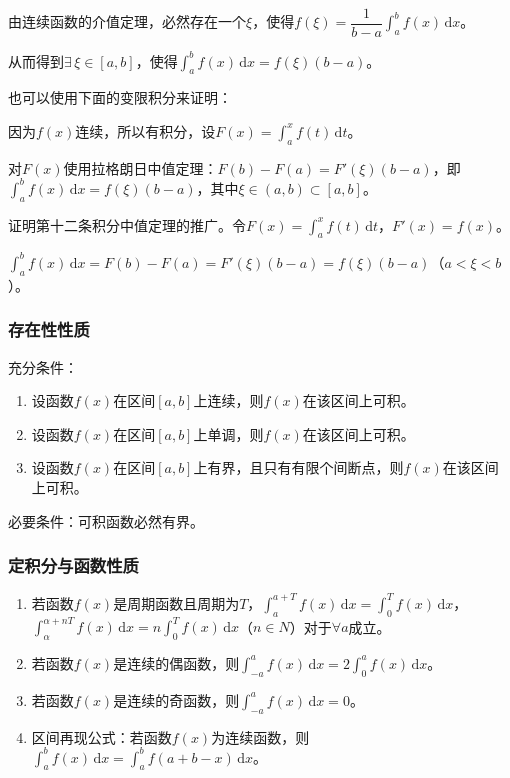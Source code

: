 \documentclass[UTF8, 12pt]{ctexart}
\begin{document}
由连续函数的介值定理，必然存在一个$\xi$，使得$f(\xi)=\dfrac{1}{b-a}\int_a^bf(x)\,\textrm{d}x$。

从而得到$\exists\,\xi\in[a,b]$，使得$\int_a^bf(x)\,\textrm{d}x=f(\xi)(b-a)$。

也可以使用下面的变限积分来证明：

因为$f(x)$连续，所以有积分，设$F(x)=\int_a^xf(t)\,\textrm{d}t$。

对$F(x)$使用拉格朗日中值定理：$F(b)-F(a)=F'(\xi)(b-a)$，即$\int_a^bf(x)\,\textrm{d}x=f(\xi)(b-a)$，其中$\xi\in(a,b)\subset[a,b]$。

证明第十二条积分中值定理的推广。令$F(x)=\int_a^xf(t)\,\textrm{d}t$，$F'(x)=f(x)$。

$\int_a^bf(x)\,\textrm{d}x=F(b)-F(a)=F'(\xi)(b-a)=f(\xi)(b-a)$（$a<\xi<b$）。

\subsubsection{存在性性质}

充分条件：

\begin{enumerate}
    \item 设函数$f(x)$在区间$[a,b]$上连续，则$f(x)$在该区间上可积。
    \item 设函数$f(x)$在区间$[a,b]$上单调，则$f(x)$在该区间上可积。
    \item 设函数$f(x)$在区间$[a,b]$上有界，且只有有限个间断点，则$f(x)$在该区间上可积。
\end{enumerate}

必要条件：可积函数必然有界。

\subsubsection{定积分与函数性质}

\begin{enumerate}
    \item 若函数$f(x)$是周期函数且周期为$T$，$\int_a^{a+T}f(x)\,\textrm{d}x=\int_0^Tf(x)\,\textrm{d}x$，\\$\int_\alpha^{\alpha+nT}f(x)\,\textrm{d}x=n\int_0^Tf(x)\,\textrm{d}x$（$n\in N$）对于$\forall a$成立。
    \item 若函数$f(x)$是连续的偶函数，则$\int_{-a}^af(x)\,\textrm{d}x=2\int_0^af(x)\,\textrm{d}x$。
    \item 若函数$f(x)$是连续的奇函数，则$\int_{-a}^af(x)\,\textrm{d}x=0$。
    \item 区间再现公式：若函数$f(x)$为连续函数，则$\int_a^bf(x)\,\textrm{d}x=\int_a^bf(a+b-x)\,\textrm{d}x$。
\end{enumerate}
\end{document}
